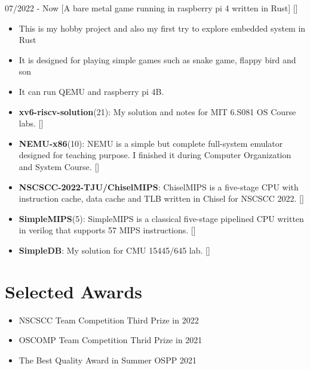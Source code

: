 \documentclass{chicv}
\begin{document}
  {07/2022 - Now}
  [A bare metal game running in raspberry pi 4 written in Rust]
  []
  \begin{itemize}
    \item This is my hobby project and also my first try to explore embedded system in Rust 
    \item It is designed for playing simple games such as snake game, flappy bird and son 
    \item It can run QEMU and raspberry pi 4B.
  \end{itemize}

  \begin{itemize}
    \item \textbf{xv6-riscv-solution}(21):
    {\small My solution and notes for MIT 6.S081 OS Course labs.} []
    \item \textbf{NEMU-x86}(10):
    {\small NEMU is a simple but complete full-system emulator designed for teaching purpose. I finished it during Computer Organization and System Course.}  []
    \item \textbf{NSCSCC-2022-TJU/ChiselMIPS}:
    {\small ChiselMIPS is a five-stage CPU with instruction cache, data cache and TLB written in Chisel for NSCSCC 2022.} []
    \item \textbf{SimpleMIPS}(5):
    {\small SimpleMIPS is a classical five-stage pipelined CPU written in verilog that supports 57 MIPS instructions. } []
    \item \textbf{SimpleDB}:
    {\small My solution for CMU 15445/645 lab. } []
  \end{itemize}
  

\section{Selected Awards}
\begin{itemize}
  \item NSCSCC Team Competition Third Prize in 2022
  \item OSCOMP Team Competition Thrid Prize in 2021
  \item The Best Quality Award in Summer OSPP 2021
\end{itemize}
\end{document}
